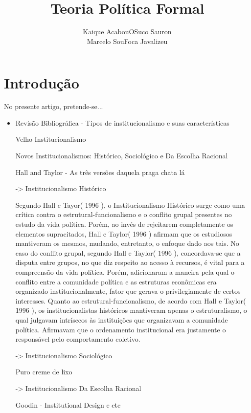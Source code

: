 \documentclass{article}
\title{ Teoria Política Formal}
\author{ Kaique AcabouOSuco Sauron \\ Marcelo SouFoca Javalizeu }
\date{}
\begin{document}
\maketitle

\newpage

\section{ Introdução }

No presente artigo, pretende-se...

\begin{itemize}

\item Revisão Bibliográfica - Tipos de institucionalismo e suas características

	\subitem Velho Institucionalismo
    
	\subitem Novos Institucionalismos: Histórico, Sociológico e Da Escolha Racional

		Hall and Taylor - As três versões daquela praga chata lá

			-> Institucionalismo Histórico
			
				Segundo Hall e Tayor( 1996 ), o Institucionalismo Histórico surge como uma crítica contra o estrutural-funcionalismo e o conflito grupal presentes no estudo da vida política. Porém, ao invés de rejeitarem completamente os elementos supracitados, Hall e Taylor( 1996 ) afirmam que os estudiosos mantiveram os mesmos, mudando, entretanto, o enfoque dado aos tais.
				No caso do conflito grupal, segundo Hall e Taylor( 1996 ), concordava-se que a disputa entre grupos, no que diz respeito ao acesso à recursos, é vital para a compreensão da vida política. Porém, adicionaram a maneira pela qual o conflito entre a comunidade política e as estruturas econômicas era organizado institucionalmente, fator que gerava o privilegiamente de certos interesses.
				Quanto ao estrutural-funcionalismo, de acordo com Hall e Taylor( 1996 ), os institucionalistas históricos mantiveram apenas o estruturalismo, o qual julgavam intrísecos às instituições que organizavam a comunidade política. Afirmavam que o ordenamento institucional era justamente o responsável pelo comportamento coletivo.
			
			-> Institucionalismo Sociológico
			
				Puro creme de lixo
			
			-> Institucionalismo Da Escolha Racional
			
			

		Goodin - Institutional Design e etc

			

\end{itemize}
\end{document}
